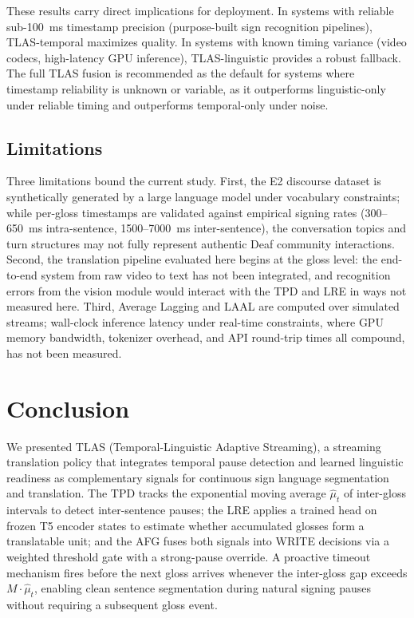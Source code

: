 \documentclass[conference]{IEEEtran}
\begin{document}
These results carry direct implications for deployment. In systems with reliable sub-100~ms timestamp precision (purpose-built sign recognition pipelines), TLAS-temporal maximizes quality. In systems with known timing variance (video codecs, high-latency GPU inference), TLAS-linguistic provides a robust fallback. The full TLAS fusion is recommended as the default for systems where timestamp reliability is unknown or variable, as it outperforms linguistic-only under reliable timing and outperforms temporal-only under noise.

\subsection{Limitations}

Three limitations bound the current study. First, the E2 discourse dataset is synthetically generated by a large language model under vocabulary constraints; while per-gloss timestamps are validated against empirical signing rates (300--650~ms intra-sentence, 1500--7000~ms inter-sentence), the conversation topics and turn structures may not fully represent authentic Deaf community interactions. Second, the translation pipeline evaluated here begins at the gloss level: the end-to-end system from raw video to text has not been integrated, and recognition errors from the vision module would interact with the TPD and LRE in ways not measured here. Third, Average Lagging and LAAL are computed over simulated streams; wall-clock inference latency under real-time constraints, where GPU memory bandwidth, tokenizer overhead, and API round-trip times all compound, has not been measured.

\section{Conclusion}

We presented TLAS (Temporal-Linguistic Adaptive Streaming), a streaming translation policy that integrates temporal pause detection and learned linguistic readiness as complementary signals for continuous sign language segmentation and translation. The TPD tracks the exponential moving average $\hat{\mu}_t$ of inter-gloss intervals to detect inter-sentence pauses; the LRE applies a trained head on frozen T5 encoder states to estimate whether accumulated glosses form a translatable unit; and the AFG fuses both signals into WRITE decisions via a weighted threshold gate with a strong-pause override. A proactive timeout mechanism fires before the next gloss arrives whenever the inter-gloss gap exceeds $M \cdot \hat{\mu}_t$, enabling clean sentence segmentation during natural signing pauses without requiring a subsequent gloss event.
\end{document}
